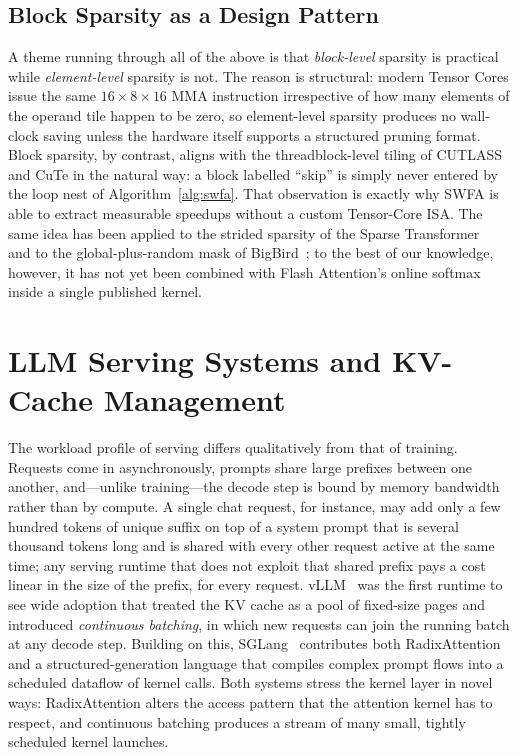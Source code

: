 \subsection{Block Sparsity as a Design
Pattern}\label{sec:lit_block_sparsity}
A theme running through all of the above is that \emph{block-level}
sparsity is practical while \emph{element-level} sparsity is not.
The reason is structural: modern Tensor Cores issue the same
$16 \times 8 \times 16$ MMA instruction irrespective of how many
elements of the operand tile happen to be zero, so element-level
sparsity produces no wall-clock saving unless the hardware itself
supports a structured pruning format. Block sparsity, by contrast,
aligns with the threadblock-level tiling of CUTLASS and CuTe in the
natural way: a block labelled ``skip'' is simply never entered by
the loop nest of Algorithm~\ref{alg:swfa}. That observation is
exactly why SWFA is able to extract measurable speedups without a
custom Tensor-Core ISA. The same idea has been applied to the
strided sparsity of the Sparse
Transformer~\cite{child2019generating} and to the global-plus-random
mask of BigBird~\cite{zaheer2020bigbird}; to the best of our
knowledge, however, it has not yet been combined with Flash
Attention's online softmax inside a single published kernel.

\section{LLM Serving Systems and KV-Cache Management}\label{sec:lit_serving}

The workload profile of serving differs qualitatively from that of
training. Requests come in asynchronously, prompts share large
prefixes between one another, and---unlike training---the decode
step is bound by memory bandwidth rather than by compute. A single
chat request, for instance, may add only a few hundred tokens of
unique suffix on top of a system prompt that is several thousand
tokens long and is shared with every other request active at the
same time; any serving runtime that does not exploit that shared
prefix pays a cost linear in the size of the prefix, for every
request. vLLM~\cite{vllm} was the first runtime to see wide adoption
that treated the KV cache as a pool of fixed-size pages and
introduced \emph{continuous batching}, in which new requests can
join the running batch at any decode step. Building on this,
SGLang~\cite{sglang} contributes both RadixAttention and a
structured-generation language that compiles complex prompt flows
into a scheduled dataflow of kernel calls. Both systems stress the
kernel layer in novel ways: RadixAttention alters the access pattern
that the attention kernel has to respect, and continuous batching
produces a stream of many small, tightly scheduled kernel launches.

